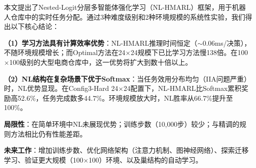\documentclass[12pt,a4paper]{article}
\begin{document}
本文提出了Nested-Logit分层多智能体强化学习（NL-HMARL）框架，用于机器人仓库中的实时任务分配。通过3种难度级别和2种环境规模的系统性实验，我们得出以下核心结论：

\textbf{（1）学习方法具有计算效率优势}：NL-HMARL推理时间恒定（$\sim$0.06ms/决策），不随环境规模增长；而Optimal方法在24$\times$24规模下已比学习方法慢138倍。在100$\times$100级别的大型电商仓库中，这一优势将扩大到数十倍以上。

\textbf{（2）NL结构在复杂场景下优于Softmax}：当任务效用分布均匀（IIA问题严重）时，NL优势显现。在Config3-Hard 24$\times$24配置下，NL-HMARL比Softmax累积奖励高52.6\%，任务完成数多44.7\%。环境规模放大时，NL胜率从66.7\%提升至100\%。

\textbf{局限性}：在简单环境中NL未展现优势；训练步数（10,000步）较少；与精调的规则方法相比仍有性能差距。

\textbf{未来工作}：增加训练步数、优化网络架构（注意力机制、图神经网络）、探索迁移学习、验证更大规模（100$\times$100）环境、以及巢结构的自动学习。



\end{document}
